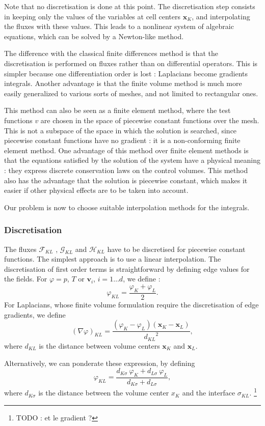 \documentclass[12pt]{article}
\newcommand{\vb}[1]{\ensuremath{\boldsymbol #1}}
\begin{document}
Note that no discretisation is done at this point. The discretisation
step consists in keeping only the values of the variables at cell
centers $\vb{x}_K$, and interpolating the fluxes with these
values. This leads to a nonlinear system of algebraic equations, which
can be solved by a Newton-like method.

The difference with the classical finite differences method is that
the discretisation is performed on fluxes rather than on differential
operators. This is simpler because one differentiation order is lost :
Laplacians become gradients integrals. Another advantage is that the
finite volume method is much more easily generalized to various sorts
of meshes, and not limited to rectangular ones.

This method can also be seen as a finite element method, where the
test functions $v$ are chosen in the space of piecewise constant
functions over the mesh. This is not a subspace of the space in which
the solution is searched, since piecewise constant functions have no
gradient : it is a non-conforming finite element method. One advantage
of this method over finite element methods is that the equations
satisfied by the solution of the system have a physical meaning : they
express discrete conservation laws on the control volumes. This method
also has the advantage that the solution is piecewise constant, which
makes it easier if other physical effects are to be taken into
account.

Our problem is now to choose suitable interpolation methods for the
integrals.
\subsubsection{Discretisation}
The fluxes $\mathcal F_{KL}$ , $\mathcal G_{KL}$ and $\mathcal H_{KL}$
have to be discretised for piecewise constant functions. The simplest
approach is to use a linear interpolation. The discretisation of first
order terms is straightforward by defining edge values for the
fields. For $\varphi = p$, $T$ or $\vb{v_{i}}$, $i = 1 \dots d$, we
define : $$\varphi_{KL} = \frac{\varphi_{K} + \varphi_{L}}{2}.$$ For
Laplacians, whose finite volume formulation require the discretisation
of edge gradients, we define $$(\nabla \varphi)_{KL} =
\frac{(\varphi_{K} - \varphi_{L}) (\vb{x}_{K} - \vb{x_{L}})}
{{d_{KL}}^{2}},$$ where $d_{KL}$ is the distance between volume
centers $\vb{x}_{K}$ and $\vb{x}_{L}$.

Alternatively, we can ponderate these expression, by
defining $$\varphi_{KL} = \frac{d_{K\sigma} \ \varphi_{K} +
  d_{L\sigma} \ \varphi_{L}}{d_{K\sigma} + d_{L\sigma}},$$ where $d_{K
  \sigma}$ is the distance between the volume center $x_{K}$ and the
interface $\sigma_{KL}$. \footnote{TODO : et le gradient ?}
\end{document}
